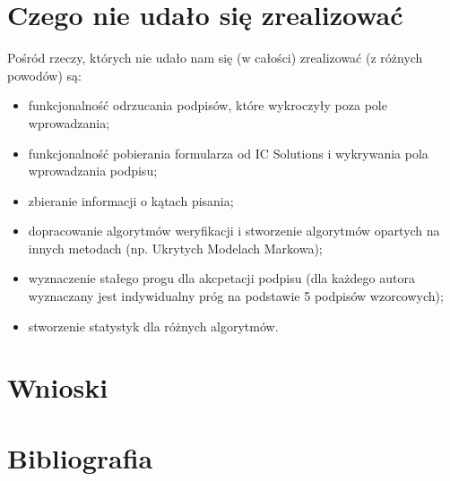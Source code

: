 \documentclass[notitlepage, oneside]{report}
\begin{document}
\chapter*{Czego nie udało się zrealizować}
Pośród rzeczy, których nie udało nam się (w całości) zrealizować (z różnych powodów) są:
 \begin{itemize}
  \item funkcjonalność odrzucania podpisów, które wykroczyły poza pole wprowadzania;
  \item funkcjonalność pobierania formularza od IC Solutions i wykrywania pola wprowadzania podpisu;
  \item zbieranie informacji o kątach pisania;
  \item dopracowanie algorytmów weryfikacji i stworzenie algorytmów opartych na innych metodach (np. Ukrytych Modelach Markowa);
  \item wyznaczenie stałego progu dla akcpetacji podpisu (dla każdego autora wyznaczany jest indywidualny próg na podstawie 5 podpisów wzorcowych);
  \item stworzenie statystyk dla różnych algorytmów.
 
 \end{itemize}
 
\chapter*{Wnioski}

\chapter*{Bibliografia}
\end{document}
